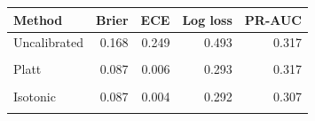\begin{tabular}{@{}lrrrr@{}}
\toprule
Method & Brier & ECE & Log loss & PR-AUC \\
\midrule
Uncalibrated & 0.168 & 0.249 & 0.493 & 0.317 \\\\
Platt & 0.087 & 0.006 & 0.293 & 0.317 \\\\
Isotonic & 0.087 & 0.004 & 0.292 & 0.307 \\\\
\bottomrule
\end{tabular}
